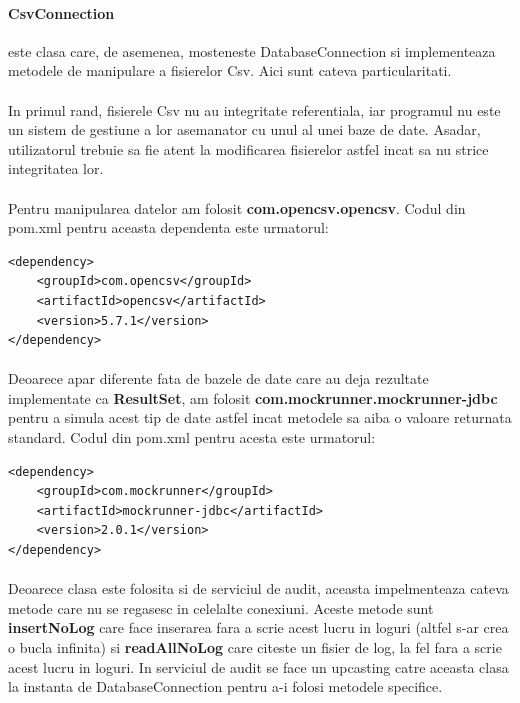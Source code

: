 \documentclass[oneside]{article}
\begin{document}
\paragraph{CsvConnection} este clasa care, de asemenea, mosteneste DatabaseConnection si implementeaza metodele de manipulare a fisierelor Csv. Aici sunt cateva particularitati.

\paragraph{} In primul rand, fisierele Csv nu au integritate referentiala, iar programul nu este un sistem de gestiune a lor asemanator cu unul al unei baze de date. Asadar, utilizatorul trebuie sa fie atent la modificarea fisierelor astfel incat sa nu strice integritatea lor.

\paragraph{} Pentru manipularea datelor am folosit \textbf{com.opencsv.opencsv}. Codul din pom.xml pentru aceasta dependenta este urmatorul:

\begin{center}
    \begin{lstlisting}[language=pom]
<dependency>
    <groupId>com.opencsv</groupId>
    <artifactId>opencsv</artifactId>
    <version>5.7.1</version>
</dependency>
    \end{lstlisting}
\end{center}

\paragraph{} Deoarece apar diferente fata de bazele de date care au deja rezultate implementate ca \textbf{ResultSet}, am folosit \textbf{com.mockrunner.mockrunner-jdbc} pentru a simula acest tip de date astfel incat metodele sa aiba o valoare returnata standard. Codul din pom.xml pentru acesta este urmatorul:

\begin{center}
    \begin{lstlisting}[language=pom]
<dependency>
    <groupId>com.mockrunner</groupId>
    <artifactId>mockrunner-jdbc</artifactId>
    <version>2.0.1</version>
</dependency>
    \end{lstlisting}
\end{center}

\paragraph{} Deoarece clasa este folosita si de serviciul de audit, aceasta impelmenteaza cateva metode care nu se regasesc in celelalte conexiuni. Aceste metode sunt \textbf{insertNoLog} care face inserarea fara a scrie acest lucru in loguri (altfel s-ar crea o bucla infinita) si \textbf{readAllNoLog} care citeste un fisier de log, la fel fara a scrie acest lucru in loguri. In serviciul de audit se face un upcasting catre aceasta clasa la instanta de DatabaseConnection pentru a-i folosi metodele specifice.
\end{document}
